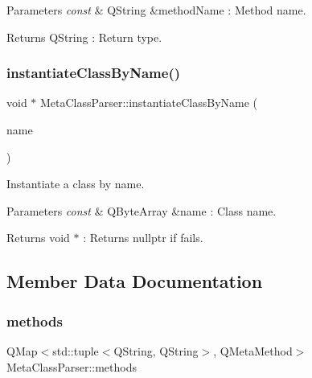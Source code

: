 \begin{DoxyParams}{Parameters}
{\em const} & Q\+String \&method\+Name \+: Method name. \\
\hline
\end{DoxyParams}
\begin{DoxyReturn}{Returns}
Q\+String \+: Return type. 
\end{DoxyReturn}
\mbox{\label{class_meta_class_parser_a1441f0bf6e0db301ea726279d535c49b}} 
\subsubsection{\texorpdfstring{instantiate\+Class\+By\+Name()}{instantiateClassByName()}}
{\footnotesize\ttfamily void $\ast$ Meta\+Class\+Parser\+::instantiate\+Class\+By\+Name (\begin{DoxyParamCaption}\item[{const Q\+Byte\+Array \&}]{name }\end{DoxyParamCaption})\hspace{0.3cm}{\ttfamily [static]}}



Instantiate a class by name. 


\begin{DoxyParams}{Parameters}
{\em const} & Q\+Byte\+Array \&name \+: Class name. \\
\hline
\end{DoxyParams}
\begin{DoxyReturn}{Returns}
void $\ast$ \+: Returns nullptr if fails. 
\end{DoxyReturn}


\subsection{Member Data Documentation}
\mbox{\label{class_meta_class_parser_a4c5651fa8ac8528bc01c0d2406a89c28}} 
\subsubsection{\texorpdfstring{methods}{methods}}
{\footnotesize\ttfamily Q\+Map$<$std\+::tuple$<$Q\+String, Q\+String$>$, Q\+Meta\+Method$>$ Meta\+Class\+Parser\+::methods}

